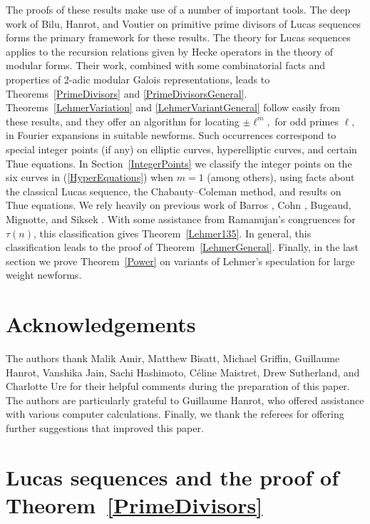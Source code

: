 \documentclass[12pt]{amsart}
\newcommand{\?}{\color{red}?}
\numberwithin{equation}{section}
\begin{document}
The proofs of these results make use of a number of important tools. 
The deep work of Bilu, Hanrot, and Voutier
\cite{BHV} on primitive prime divisors of Lucas sequences forms the primary framework for these results. 
The theory for Lucas sequences applies to the recursion relations given
by Hecke operators in the theory of modular forms. Their work, combined with some combinatorial facts and properties of 2-adic modular Galois representations, leads to Theorems~\ref{PrimeDivisors} and \ref{PrimeDivisorsGeneral}. 
Theorems~\ref{LehmerVariation} and \ref{LehmerVariantGeneral}
follow easily from these results, and they 
 offer an algorithm for locating $\pm \ell^m,$ for odd primes $\ell,$ in Fourier expansions in suitable newforms.
Such occurrences correspond to  special integer points (if any) on elliptic curves, hyperelliptic curves, and certain Thue equations.
 In Section~\ref{IntegerPoints} we classify the integer points on the six curves
in (\ref{HyperEquations}) when $m=1$ (among others), using facts about the classical Lucas sequence,  the Chabauty--Coleman method, and results on Thue equations. We rely  heavily on previous work of Barros \cite{Barros}, Cohn \cite{Cohn}, Bugeaud, Mignotte, and Siksek \cite{BMS}.
With some assistance from Ramanujan's congruences for $\tau(n)$, this classification gives Theorem~\ref{Lehmer135}. In general, this classification
  leads to the proof of Theorem~\ref{LehmerGeneral}.
Finally, in the last section we prove Theorem~\ref{Power} on variants of Lehmer's speculation for large weight newforms.
  
 \section*{Acknowledgements} 
\noindent
The authors thank Malik Amir, Matthew Bisatt, Michael Griffin, Guillaume Hanrot, Vanshika Jain, Sachi Hashimoto, C\'eline Maistret, Drew Sutherland, and Charlotte Ure for their helpful comments during the preparation of this paper. The authors are particularly grateful to Guillaume Hanrot, who
offered assistance with various computer calculations. Finally, we thank the referees for offering further suggestions that improved this paper.



\section{Lucas sequences and the proof of Theorem~\ref{PrimeDivisors}}\label{PPD}
\end{document}
